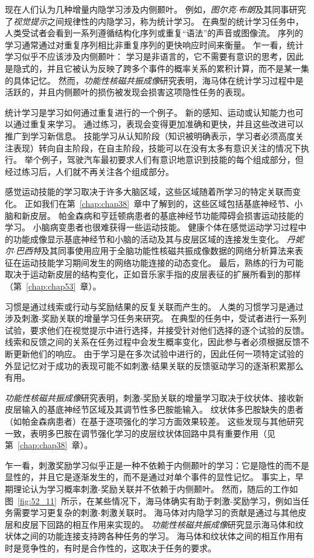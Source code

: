 现在人们认为几种增量内隐学习涉及内侧颞叶。
例如，\textit{图尔克$\cdot$布朗}及其同事研究了\textit{视觉提示}之间规律性的内隐学习，称为统计学习。
在典型的统计学习任务中，人类受试者会看到一系列遵循结构化序列或重复“语法”的声音或图像流。
序列的学习通常通过对重复序列相比非重复序列的更快响应时间来衡量。
乍一看，统计学习似乎不应该涉及内侧颞叶：
学习是非语言的，它不需要有意识的思考，因此是隐式的，并且它被认为反映了跨多个事件的概率关系的累积计算，而不是某一集的具体记忆。
然而，\textit{功能性核磁共振成像}研究表明，海马体在统计学习过程中是活跃的，并且内侧颞叶的损伤被发现会损害这项隐性任务的表现。


统计学习是学习如何通过重复进行的一个例子。
新的感知、运动或认知能力也可以通过重复来学习。
通过练习，表现会变得更加准确和更快，并且这些改进可以推广到学习新信息。
技能学习从认知阶段（知识被明确表示，学习者必须高度关注表现）转向自主阶段，在自主阶段，技能可以在没有太多有意识关注的情况下执行。
举个例子，驾驶汽车最初要求人们有意识地意识到技能的每个组成部分，但经过练习后，人们就不再关注各个组成部分。


感觉运动技能的学习取决于许多大脑区域，这些区域随着所学习的特定关联而变化。
正如我们在第~\ref{chap:chap38}~章中了解到的，这些区域包括基底神经节、小脑和新皮层。
帕金森病和亨廷顿病患者的基底神经节功能障碍会损害运动技能的学习。
小脑病变患者也很难获得一些运动技能。
健康个体在感觉运动学习过程中的功能成像显示基底神经节和小脑的活动及其与皮层区域的连接发生变化。
\textit{丹妮尔$\cdot$巴西特}及其同事使用应用于全脑功能性核磁共振成像数据的网络分析算法来表征在运动技能学习期间发生的网络功能连接的动态变化。
最后，熟练的行为可能取决于运动新皮层的结构变化，正如音乐家手指的皮层表征的扩展所看到的那样（第~\ref{chap:chap53}~章）。


习惯是通过线索或行动与奖励结果的反复关联而产生的。
人类的习惯学习是通过涉及刺激-奖励关联的增量学习任务来研究。
在典型的任务中，受试者进行一系列试验，要求他们在视觉提示中进行选择，并接受针对他们选择的逐个试验的反馈。
线索和反馈之间的关系在任务过程中会发生概率变化，因此参与者必须根据反馈不断更新他们的响应。
由于学习是在多次试验中进行的，因此任何一项特定试验的外显记忆对于成功的表现可能不如刺激-结果关联的反馈驱动学习的逐渐积累那么有用。


\textit{功能性核磁共振成像}研究表明，刺激-奖励关联的增量学习取决于纹状体、接收新皮层输入的基底神经节区域及其调节性多巴胺能输入。
纹状体多巴胺缺失的患者（如帕金森病患者）在基于逐项强化的学习方面效果较差。
这些发现与其他研究一致，表明多巴胺在调节强化学习的皮层纹状体回路中具有重要作用（见第~\ref{chap:chap38}~章）。


乍一看，刺激奖励学习似乎正是一种不依赖于内侧颞叶的学习：它是隐性的而不是显性的，并且它是逐渐发生的，而不是通过对单个事件的显性记忆。
事实上，早期理论认为学习概率刺激-奖励关联并不依赖于内侧颞叶。
然而，随后的工作如图~\ref{fig:52_11}~所示，在某些情况下，海马体确实有助于刺激-奖励学习，例如当任务需要学习更复杂的刺激-刺激关联时。
海马体对内隐学习的贡献是通过与其他皮层和皮层下回路的相互作用来实现的。
\textit{功能性核磁共振成像}研究显示海马体和纹状体之间的功能连接支持跨各种任务的学习。
海马体和纹状体之间的相互作用有时是竞争性的，有时是合作性的，这取决于任务的要求。


